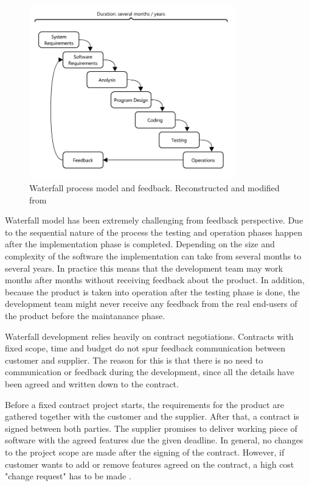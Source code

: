 \documentclass[english,12pt,a4paper,pdftex]{article}
\begin{document}
\begin{figure}[htb]
\begin{center}
\includegraphics[width=0.8\textwidth]{waterfall_reconstructed.png}
\end{center}
\caption{Waterfall process model and feedback. Reconstructed and modified from \citet{royce1970}}
\label{fig:waterfall}
\end{figure}


Waterfall model has been extremely challenging from feedback perspective. Due to the sequential nature of the process the testing and operation phases happen after the implementation phase is completed. Depending on the size and complexity of the software the implementation can take from several months to several years. In practice this means that the development team may work months after months without receiving feedback about the product. In addition, because the product is taken into operation after the testing phase is done, the development team might never receive any feedback from the real end-users of the product before the maintanance phase.

Waterfall development relies heavily on contract negotiations. Contracts with fixed scope, time and budget do not spur feedback communication between customer and supplier. The reason for this is that there is no need to communication or feedback during the development, since all the details have been agreed and written down to the contract. 

Before a fixed contract project starts, the requirements for the product are gathered together with the customer and the supplier. After that, a contract is signed between both parties. The supplier promises to deliver working piece of software with the agreed features due the given deadline. In general, no changes to the project scope are made after the signing of the contract. However, if customer wants to add or remove features agreed on the contract, a high cost "change request" has to be made \citep{beck2004}. 
\end{document}
